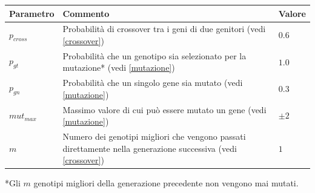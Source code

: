 \documentclass[a4paper,12pt]{article}
\begin{document}
\begin{center}
	\begin{tabular}{| m{2.5cm} | m{6cm} | m{2cm} |}
		\hline
		\textbf{Parametro} & \textbf{Commento}& \textbf{Valore} \\ \hline
		$p_{cross}$ & Probabilità di crossover tra i geni di due genitori (vedi \autoref{crossover})  & $0.6$ \\ \hline
		$p_{gt}$ & Probabilità che un genotipo sia selezionato per la mutazione* (vedi \autoref{mutazione})  & $1.0$ \\ \hline
		$p_{gn}$ & Probabilità che un singolo gene sia mutato (vedi \autoref{mutazione})  & $0.3$ \\ \hline
		$mut_{max}$ & Massimo valore di cui può essere mutato un gene (vedi \autoref{mutazione})  & $\pm 2$ \\ \hline
		$m$ & Numero dei genotipi migliori che vengono passati direttamente nella generazione successiva (vedi \autoref{crossover})  & $1$ \\ \hline
	\end{tabular}
	\begin{tablenotes}
		*Gli $m$ genotipi migliori della generazione precedente non vengono mai mutati.
	\end{tablenotes}
\end{center} 
\end{document}
